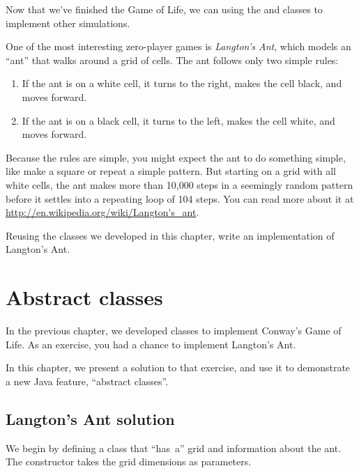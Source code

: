 \begin{exercise}

Now that we've finished the Game of Life, we can using the  and  classes to implement other simulations.

One of the most interesting zero-player games is {\it Langton's Ant}, which models an ``ant'' that walks around a grid of cells.
The ant follows only two simple rules:

\begin{enumerate}
\item If the ant is on a white cell, it turns to the right, makes the cell black, and moves forward.
\item If the ant is on a black cell, it turns to the left, makes the cell white, and moves forward.
\end{enumerate}

Because the rules are simple, you might expect the ant to do something simple, like make a square or repeat a simple pattern.
But starting on a grid with all white cells, the ant makes more than 10,000 steps in a seemingly random pattern before it settles into a repeating loop of 104 steps.
You can read more about it at \url{http://en.wikipedia.org/wiki/Langton's_ant}.

Reusing the classes we developed in this chapter, write an implementation of Langton's Ant.

\end{exercise}



\chapter{Abstract classes}

In the previous chapter, we developed classes to implement Conway's Game of Life.
As an exercise, you had a chance to implement Langton's Ant.

In this chapter, we present a solution to that exercise, and use it to demonstrate a new Java feature, ``abstract classes''.


\section{Langton's Ant solution}

We begin by defining a  class that ``has~a'' grid and information about the ant.
The constructor takes the grid dimensions as parameters.

